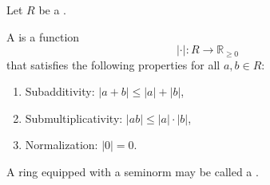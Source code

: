 \begin{definition} \label{definition:seminorm_on_a_commutative_ring}
Let $R$ be a .

A  is a function
$$
| \cdot | : R \to \mathbb{R}_{\geq 0}
$$
that satisfies the following properties for all $a, b \in R$:

\begin{enumerate}
    \item Subadditivity: $|a + b| \leq |a| + |b|$,
    \item Submultiplicativity: $|ab| \leq |a| \cdot |b|$,
    \item Normalization: $|0| = 0$.
\end{enumerate}

A ring equipped with a seminorm may be called a .
\end{definition}